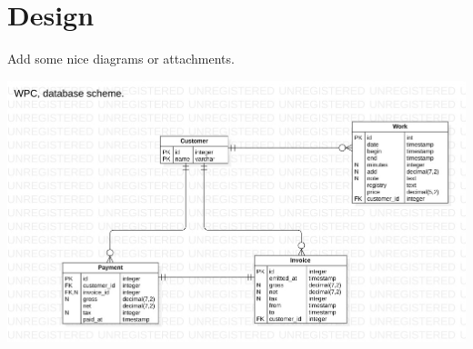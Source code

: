 \graphicspath{ {./images/} }

\section{Design}
Add some nice diagrams or attachments.

\includegraphics[scale=0.4]{wpc_data_model}
